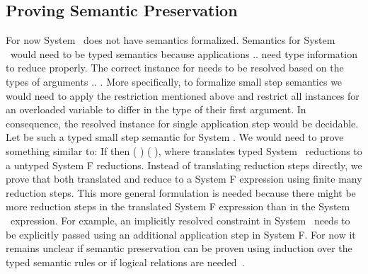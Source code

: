 \subsection{Proving Semantic Preservation }
For now System \Fo\ does not have semantics formalized.
Semantics for System \Fo\ would need to be typed semantics because applications     $..$   need type information to reduce properly.
The correct instance for  needs to be resolved based on the types of arguments  $..$ . 
More specifically, to formalize small step semantics we would need to apply the restriction mentioned above and restrict all instances for an overloaded variable  to differ in the type of their first argument. In consequence, the resolved instance for single application step     would be decidable.
Let    be such a typed small step semantic for System \Fo. We would need to prove something similar to: If    then  \Constr{[}  \Constr{]} (   )  (   ), where  translates typed System \Fo\ reductions to a untyped System F reductions.
Instead of translating reduction steps directly, we prove that both translated  and  reduce to a System F expression  using finite many reduction steps.
This more general formulation is needed because there might be more reduction steps in the translated System F expression than in the System \Fo\ expression. 
For example, an implicitly resolved constraint in System \Fo\ needs to be explicitly passed using an additional application step in System F. 
For now it remains unclear if semantic preservation can be proven using induction over the typed semantic rules or if logical relations are needed~\cite{logrel}.

